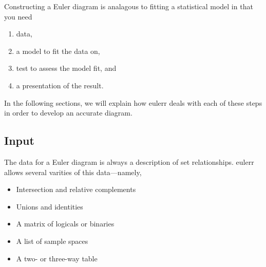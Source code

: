 \documentclass[
  a4paper,
  nofonts,
  nobib,
  titlepage,
  justified,
  marginals=raggedouter,
  nohyper
]{tufte-handout}\usepackage[]{graphicx}\usepackage[]{color}
\newcommand{\pkg}[1]{{\fontseries{b}\selectfont #1}}
\begin{document}
Constructing a Euler diagram is analagous to fitting a
statistical model in that you need
\begin{enumerate}
\item data,
\item a model to fit the data on,
\item test to assess the model fit, and
\item a presentation of the result.
\end{enumerate}

In the following sections, we will explain how \pkg{eulerr} deals with
each of these steps in order to develop an accurate diagram.

\subsection{Input}

The data for a Euler diagram is always
a description of set relationships. \pkg{eulerr} allows several varities of
this data---namely,

\begin{itemize}
\item Intersection and relative complements
\item Unions and identities
\item A matrix of logicals or binaries
\item A list of sample spaces
\item A two- or three-way table 
\end{itemize}
\end{document}
